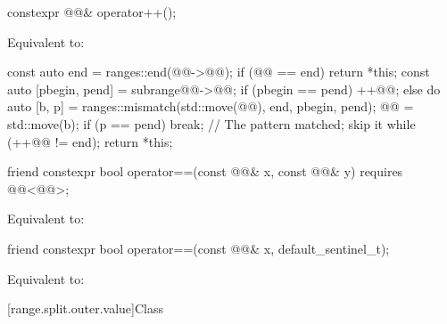 %
\begin{itemdecl}
constexpr @@& operator++();
\end{itemdecl}

\begin{itemdescr}
\pnum
\effects
Equivalent to:
\begin{codeblock}
const auto end = ranges::end(@@->@@);
if (@@ == end) return *this;
const auto [pbegin, pend] = subrange{@@->@@};
if (pbegin == pend) ++@@;
else {
  do {
    auto [b, p] = ranges::mismatch(std::move(@@), end, pbegin, pend);
    @@ = std::move(b);
    if (p == pend) {
      break;            // The pattern matched; skip it
    }
  } while (++@@ != end);
}
return *this;
\end{codeblock}
\end{itemdescr}

%
\begin{itemdecl}
friend constexpr bool operator==(const @@& x, const @@& y)
  requires @@<@@>;
\end{itemdecl}

\begin{itemdescr}
\pnum
\effects
Equivalent to: 
\end{itemdescr}

%
\begin{itemdecl}
friend constexpr bool operator==(const @@& x, default_sentinel_t);
\end{itemdecl}

\begin{itemdescr}
\pnum
\effects
Equivalent to: 
\end{itemdescr}

[range.split.outer.value]{Class }

